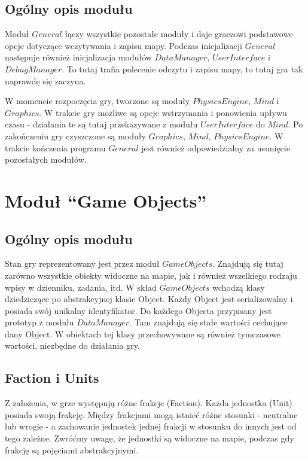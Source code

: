 \documentclass[licencjacka]{pracamgr}
\begin{document}
    \subsection{Ogólny opis modułu}
      Moduł $General$ łączy wszystkie pozostałe moduły i daje graczowi podstawowe opcje dotyczące wczytywania i zapisu
      mapy. Podczas inicjalizacji $General$ następuje również inicjalizacja modułów $DataManager$, $UserInterface$ i
      $DebugManager$. To tutaj trafia polecenie odczytu i zapisu mapy, to tutaj gra tak naprawdę się zaczyna.

      W momencie rozpoczęcia gry, tworzone są moduły $PhysicsEngine$, $Mind$ i $Graphics$. W trakcie gry możliwe są
      opcje wstrzymania i ponowienia upływu czasu - działania te są tutaj przekazywane z modułu $UserInterface$ do
      $Mind$. Po zakończeniu gry czyszczone są moduły $Graphics$, $Mind$, $PhysicsEngine$. W trakcie kończenia programu
      $General$ jest również odpowiedzialny za usunięcie pozostałych modułów.

  \section{Moduł ``Game Objects''}
    \subsection{Ogólny opis modułu}
      Stan gry reprezentowany jest przez moduł $GameObjects$. Znajdują się tutaj zarówno wszystkie obiekty widoczne na
      mapie, jak i również wszelkiego rodzaju wpisy w dzienniku, zadania, itd. W skład $GameObjects$ wchodzą klasy
      dziedziczące po abstrakcyjnej klasie Object. Każdy Object jest serializowalny i posiada swój unikalny
      identyfikator. Do każdego Objecta przypisany jest prototyp z modułu $DataManager$. Tam znajdują się stałe
      wartości cechujące dany Object. W obiektach tej klasy przechowywane są również tymczasowe wartości, niezbędne
      do działania gry.

    \subsection{Faction i Units}
      Z założenia, w grze występują różne frakcje (Faction). Każda jednostka (Unit) posiada swoją frakcję. Między
      frakcjami mogą istnieć różne stosunki - neutralne lub wrogie - a zachowanie jednostek jednej frakcji w stosunku
      do innych jest od tego zależne. Zwróćmy uwagę, że jednostki są widoczne na mapie, podczas gdy frakcję są
      pojęciami abstrakcyjnymi.
\end{document}
